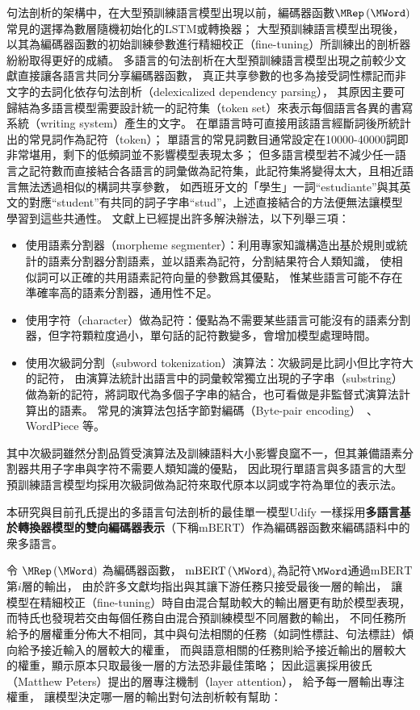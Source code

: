 句法剖析的架構中，在大型預訓練語言模型出現以前，編碼器函數$\MRep\left(\MWord\right)$常見的選擇為數層隨機初始化的LSTM或轉換器；
大型預訓練語言模型出現後，以其為編碼器函數的初始訓練參數進行精細校正（fine-tuning）所訓練出的剖析器紛紛取得更好的成績。
多語言的句法剖析在大型預訓練語言模型出現之前較少文獻直接讓各語言共同分享編碼器函數，
真正共享參數的也多為接受詞性標記而非文字的去詞化依存句法剖析（delexicalized dependency parsing），
其原因主要可歸結為多語言模型需要設計統一的記符集（token set）來表示每個語言各異的書寫系統（writing system）產生的文字。
在單語言時可直接用該語言經斷詞後所統計出的常見詞作為記符（token）；
單語言的常見詞數目通常設定在10000-40000詞即非常堪用，剩下的低頻詞並不影響模型表現太多；
但多語言模型若不減少任一語言之記符數而直接結合各語言的詞彙做為記符集，此記符集將變得太大，且相近語言無法透過相似的構詞共享參數，
如西班牙文的「學生」一詞``estudiante''與其英文的對應``student''有共同的詞子字串``stud''，上述直接結合的方法便無法讓模型學習到這些共通性。
文獻上已經提出許多解決辦法，以下列舉三項：
\begin{itemize}
    \item 使用語素分割器（morpheme segmenter）：利用專家知識構造出基於規則或統計的語素分割器分割語素，並以語素為記符，分割結果符合人類知識，
使相似詞可以正確的共用語素記符向量的參數爲其優點，
惟某些語言可能不存在準確率高的語素分割器，通用性不足。
    \item 使用字符（character）做為記符：優點為不需要某些語言可能沒有的語素分割器，但字符顆粒度過小，單句話的記符數變多，會增加模型處理時間。
    \item 使用次級詞分割（subword tokenization）演算法：次級詞是比詞小但比字符大的記符，
由演算法統計出語言中的詞彙較常獨立出現的子字串（substring）做為新的記符，將詞取代為多個子字串的結合，也可看做是非監督式演算法計算出的語素。
常見的演算法包括字節對編碼（Byte-pair encoding）~\cite{sennrich-etal-2016-neural}、WordPiece \cite{schuster2012japanese}等。
\end{itemize}
其中次級詞雖然分割品質受演算法及訓練語料大小影響良窳不一，但其兼備語素分割器共用子字串與字符不需要人類知識的優點，
因此現行單語言與多語言的大型預訓練語言模型均採用次級詞做為記符來取代原本以詞或字符為單位的表示法。

本研究與目前孔氏提出的多語言句法剖析的最佳單一模型Udify\cite{kondratyuk-straka-2019-75}
一樣採用\textbf{多語言基於轉換器模型的雙向編碼器表示}（下稱$\mathrm{mBERT}$）作為編碼器函數來編碼語料中的衆多語言。

令 $\MRep\left(\MWord\right)$ 為編碼器函數，
$\mathrm{mBERT}\left(\MWord\right)_{i}$為記符$\MWord$通過$\mathrm{mBERT}$第$i$層的輸出，
由於許多文獻\cite{peters-etal-2018-deep,devlin-etal-2019-bert}均指出與其讓下游任務只接受最後一層的輸出，
讓模型在精細校正（fine-tuning）時自由混合幫助較大的輸出層更有助於模型表現，
而特氏也發現\cite{tenney-etal-2019-bert}若交由每個任務自由混合預訓練模型不同層數的輸出，
不同任務所給予的層權重分佈大不相同，其中與句法相關的任務（如詞性標註、句法標註）傾向給予接近輸入的層較大的權重，
而與語意相關的任務則給予接近輸出的層較大的權重，顯示原本只取最後一層的方法恐非最佳策略；
因此這裏採用彼氏（Matthew Peters）提出的層專注機制（layer attention），
給予每一層輸出專注權重，
讓模型決定哪一層的輸出對句法剖析較有幫助：

